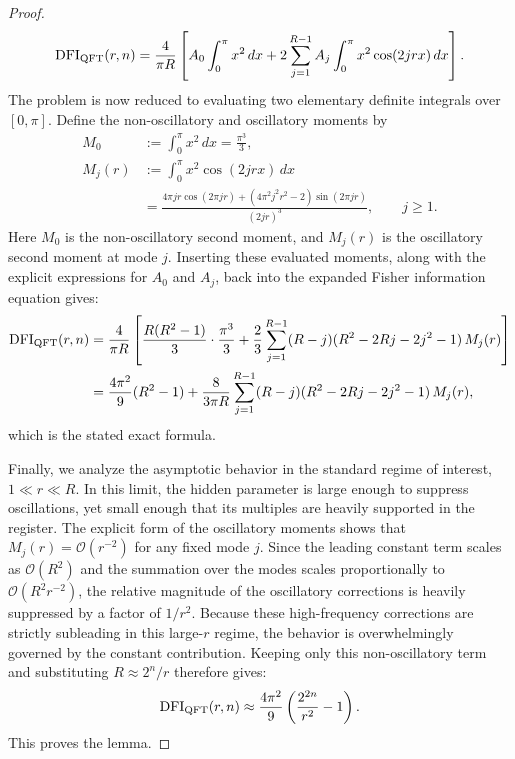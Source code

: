 \begin{proof}
    \begin{equation}
        \mathrm{DFI}_{\mathrm{QFT}}(r,n)
        =
        \frac{4}{\pi R}
        \left[
            A_0\int_0^\pi x^2\,dx
            +
            2\sum_{j=1}^{R-1}A_j\int_0^\pi x^2\cos(2jrx)\,dx
        \right].
    \end{equation}
    The problem is now reduced to evaluating two elementary definite integrals
    over $[0,\pi]$. Define the non-oscillatory and oscillatory moments by
    \begin{align}
        M_0&:=\int_0^\pi x^2\,dx=\frac{\pi^3}{3},\\
        M_j(r)&:=\int_0^\pi x^2\cos(2jrx)\,dx \nonumber\\
        &=
        \frac{
            4\pi jr\cos(2\pi jr)
            +(4\pi^2j^2r^2-2)\sin(2\pi jr)
        }{(2jr)^3},
        \qquad j\geq 1.
    \end{align}
    Here $M_0$ is the non-oscillatory second moment, and $M_j(r)$ is the
    oscillatory second moment at mode $j$.
    Inserting these evaluated moments, along with the explicit expressions for $A_0$ and $A_j$, back into the expanded Fisher information equation gives:
    \begin{align}
        \mathrm{DFI}_{\mathrm{QFT}}(r,n)
        &=
        \frac{4}{\pi R}
        \left[
            \frac{R(R^2-1)}{3}\cdot\frac{\pi^3}{3}
            +
            \frac{2}{3}
            \sum_{j=1}^{R-1}
            (R-j)(R^2-2Rj-2j^2-1)\,M_j(r)
        \right] \nonumber\\
        &=
        \frac{4\pi^2}{9}(R^2-1)
        +
        \frac{8}{3\pi R}
        \sum_{j=1}^{R-1}
        (R-j)(R^2-2Rj-2j^2-1)\,M_j(r),
    \end{align}
    which is the stated exact formula. 
    
    Finally, we analyze the asymptotic behavior in the standard regime of interest, $1 \ll r \ll R$. In this limit, the hidden parameter is large enough to suppress oscillations, yet small enough that its multiples are heavily supported in the register. The explicit form of the oscillatory moments shows that $M_j(r)=\mathcal{O}(r^{-2})$ for any fixed mode $j$. Since the leading constant term scales as $\mathcal{O}(R^2)$ and the summation over the modes scales proportionally to $\mathcal{O}(R^2 r^{-2})$, the relative magnitude of the oscillatory corrections is heavily suppressed by a factor of $1/r^2$. Because these high-frequency corrections are strictly subleading in this large-$r$ regime, the behavior is overwhelmingly governed by the constant contribution. Keeping only this non-oscillatory term and substituting $R \approx 2^n/r$ therefore gives:
    \begin{equation}
        \mathrm{DFI}_{\mathrm{QFT}}(r,n)
        \approx
        \frac{4\pi^2}{9}\left(\frac{2^{2n}}{r^2}-1\right).
        \label{eq:qft_dfi_asymptotic}
    \end{equation}
    This proves the lemma.
\end{proof}


